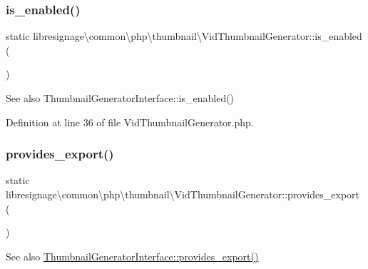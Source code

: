 \subsubsection{\texorpdfstring{is\+\_\+enabled()}{is\_enabled()}}
{\footnotesize\ttfamily static libresignage\textbackslash{}common\textbackslash{}php\textbackslash{}thumbnail\textbackslash{}\+Vid\+Thumbnail\+Generator\+::is\+\_\+enabled (\begin{DoxyParamCaption}{ }\end{DoxyParamCaption})\hspace{0.3cm}{\ttfamily [static]}}

\begin{DoxySeeAlso}{See also}
Thumbnail\+Generator\+Interface\+::is\+\_\+enabled() 
\end{DoxySeeAlso}


Definition at line 36 of file Vid\+Thumbnail\+Generator.\+php.

\mbox{\label{classlibresignage_1_1common_1_1php_1_1thumbnail_1_1VidThumbnailGenerator_a068f440ec5762055c439534a93a01ce1}} 
\subsubsection{\texorpdfstring{provides\+\_\+export()}{provides\_export()}}
{\footnotesize\ttfamily static libresignage\textbackslash{}common\textbackslash{}php\textbackslash{}thumbnail\textbackslash{}\+Vid\+Thumbnail\+Generator\+::provides\+\_\+export (\begin{DoxyParamCaption}{ }\end{DoxyParamCaption})\hspace{0.3cm}{\ttfamily [static]}}

\begin{DoxySeeAlso}{See also}
\hyperlink{interfacelibresignage_1_1common_1_1php_1_1thumbnail_1_1ThumbnailGeneratorInterface_a8740f912c85094c22b397f7df0142cde}{Thumbnail\+Generator\+Interface\+::provides\+\_\+export()} 
\end{DoxySeeAlso}


